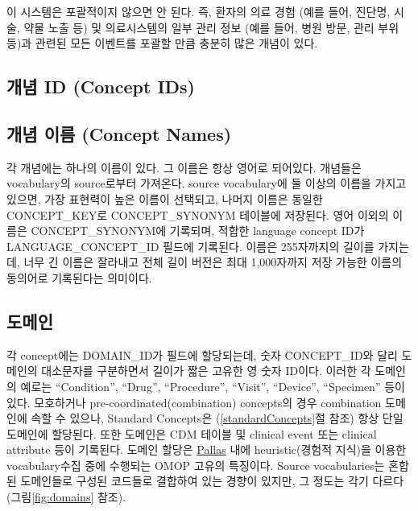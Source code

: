 \documentclass[11pt]{book}
\theoremstyle{definition}
\theoremstyle{definition}
\theoremstyle{definition}
\theoremstyle{remark}
\begin{document}
이 시스템은 포괄적이지 않으면 안 된다. 즉, 환자의 의료 경험 (예를 들어,
진단명, 시술, 약물 노출 등) 및 의료시스템의 일부 관리 정보 (예를 들어,
병원 방문, 관리 부위 등)과 관련된 모든 이벤트를 포괄할 만큼 충분히 많은
개념이 있다.

\subsection{개념 ID (Concept IDs)}\label{-id-concept-ids}

\subsection{개념 이름 (Concept Names)}\label{--concept-names}

각 개념에는 하나의 이름이 있다. 그 이름은 항상 영어로 되어있다. 개념들은
vocabulary의 source로부터 가져온다. source vocabulary에 둘 이상의 이름을
가지고 있으면, 가장 표현력이 높은 이름이 선택되고, 나머지 이름은 동일한
CONCEPT\_KEY로 CONCEPT\_SYNONYM 테이블에 저장된다. 영어 이외의 이름은
CONCEPT\_SYNONYM에 기록되며, 적합한 language concept ID가
LANGUAGE\_CONCEPT\_ID 필드에 기록된다. 이름은 255자까지의 길이를
가지는데, 너무 긴 이름은 잘라내고 전체 길이 버전은 최대 1,000자까지 저장
가능한 이름의 동의어로 기록된다는 의미이다.

\subsection{도메인}\label{conceptDomains}

각 concept에는 DOMAIN\_ID가 필드에 할당되는데, 숫자 CONCEPT\_ID와 달리
도메인의 대소문자를 구분하면서 길이가 짧은 고유한 영 숫자 ID이다. 이러한
각 도메인의 예로는 ``Condition'', ``Drug'', ``Procedure'', ``Visit'',
``Device'', ``Specimen'' 등이 있다. 모호하거나
pre-coordinated(combination) concepts의 경우 combination 도메인에 속할
수 있으나, Standard Concepts은 (\ref{standardConcepts}절 참조) 항상 단일
도메인에 할당된다. 또한 도메인은 CDM 테이블 및 clinical event 또는
clinical attribute 등이 기록된다. 도메인 할당은
\href{https://github.com/ohDSI/vocabulary-v5.0}{Pallas} 내에
heuristic(경험적 지식)을 이용한 vocabulary수집 중에 수행되는 OMOP 고유의
특징이다. Source vocabularies는 혼합된 도메인들로 구성된 코드들로
결합하여 있는 경향이 있지만, 그 정도는 각기 다르다
(그림\ref{fig:domains} 참조). 
\end{document}
